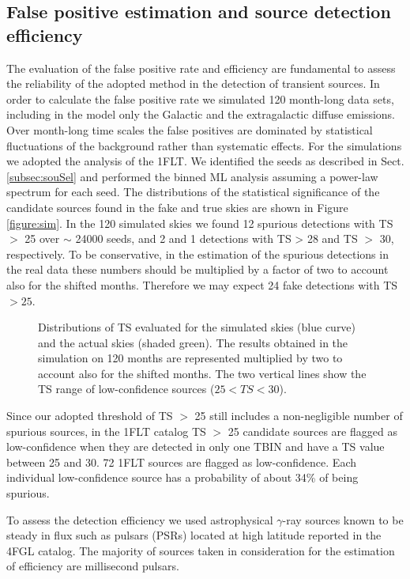 \documentclass{aastex62}
\begin{document}
\subsection{False positive estimation and source detection efficiency}\label{subsec:eff}

The evaluation of the false positive rate and efficiency are fundamental to assess the reliability of the adopted method in the detection of transient sources.
In order to calculate the false positive rate we simulated 120 month-long data sets, including in the model only the Galactic and the extragalactic diffuse emissions. Over month-long time scales the false positives are dominated by statistical fluctuations of the background rather than systematic effects. For the simulations we adopted the analysis of the 1FLT. 
We identified the seeds as described in Sect.\ref{subsec:souSel} and performed the binned ML analysis assuming a power-law spectrum for each seed.
The distributions of the statistical significance of the candidate sources found in the fake and true skies are shown in Figure \ref{figure:sim}. 
In the 120 simulated skies we found 12 spurious detections with TS $>$ 25 over $\sim$ 24000 seeds, and 2 and 1 detections with TS > 28 and TS $>$ 30, respectively. 
To be conservative, in the estimation of the spurious detections in the real data these numbers should be multiplied by a factor of two to account also for the shifted months. Therefore we may expect 24 fake detections with TS $>25$. 

\begin{figure}[hbt!]
 \caption{Distributions of TS evaluated for the simulated skies (blue curve) and the actual skies (shaded green). The results obtained in the simulation on 120 months are represented multiplied by two to account also for the shifted months. The two vertical lines show the TS range of low-confidence sources ($25<TS<30$).}
\end{figure}\label{figure:sim}

Since our adopted threshold of TS $>$ 25 still includes a non-negligible number of spurious sources, in  the 1FLT catalog TS $>$ 25 candidate sources are flagged as low-confidence when they are detected in only one TBIN and have a TS value between 25 and 30. 72 1FLT sources are flagged as low-confidence. Each individual low-confidence source has a probability of about 34\% of being spurious.

To assess the detection efficiency we used astrophysical $\gamma$-ray sources known to be steady in flux such as pulsars (PSRs) located at high latitude reported in the 4FGL catalog. The majority of sources taken in consideration for the estimation of efficiency are millisecond pulsars.
\end{document}
